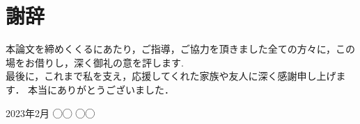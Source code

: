 \documentclass[../main]{subfiles}
\begin{document}
\chapter*{謝辞}
\label{thankyou}

\lhead[謝辞]{}
\thispagestyle{empty}

\newpage

本論文を締めくくるにあたり，ご指導，ご協力を頂きました全ての方々に，この場をお借りし，深く御礼の意を評します.
\\

最後に，これまで私を支え，応援してくれた家族や友人に深く感謝申し上げます．
本当にありがとうございました．

\begin{flushright}
  2023年2月 ◯◯ ◯◯
\end{flushright}
\end{document}
